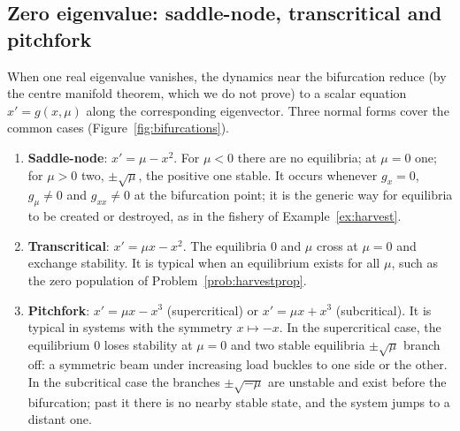 \documentclass[11pt,a4paper]{article}
\numberwithin{equation}{section}
\theoremstyle{definition}
\begin{document}
\subsection{Zero eigenvalue: saddle-node, transcritical and pitchfork}
\label{ssec:zeroeig}

When one real eigenvalue vanishes, the dynamics near the bifurcation reduce (by the centre manifold theorem, which we do not prove) to a scalar equation $x' = g(x, \mu)$ along the corresponding
eigenvector. Three normal forms cover the common cases (Figure~\ref{fig:bifurcations}).

\begin{enumerate}
\item \textbf{Saddle-node}: $x' = \mu - x^2$. For $\mu < 0$ there are no equilibria; at $\mu = 0$ one; for $\mu > 0$ two, $\pm\sqrt\mu$, the positive one stable. It occurs whenever $g_x = 0$, $g_\mu \neq 0$ and $g_{xx} \neq 0$ at the
bifurcation point; it is the generic way for equilibria to be created or destroyed, as in the fishery of Example~\ref{ex:harvest}.
\item \textbf{Transcritical}: $x' = \mu x - x^2$. The equilibria $0$ and $\mu$ cross at $\mu = 0$ and exchange stability. It is typical when an equilibrium exists for all $\mu$, such as the zero population of
Problem~\ref{prob:harvestprop}.
\item \textbf{Pitchfork}: $x' = \mu x - x^3$ (supercritical) or $x' = \mu x + x^3$ (subcritical). It is typical in systems with the symmetry $x \mapsto -x$. In the supercritical case, the equilibrium $0$ loses stability at $\mu = 0$ and two
stable equilibria $\pm\sqrt\mu$ branch off: a symmetric beam under increasing load buckles to one side or the other. In the subcritical case the branches $\pm\sqrt{-\mu}$ are unstable and exist before the bifurcation; past
it there is no nearby stable state, and the system jumps to a distant one.
\end{enumerate}
\end{document}
